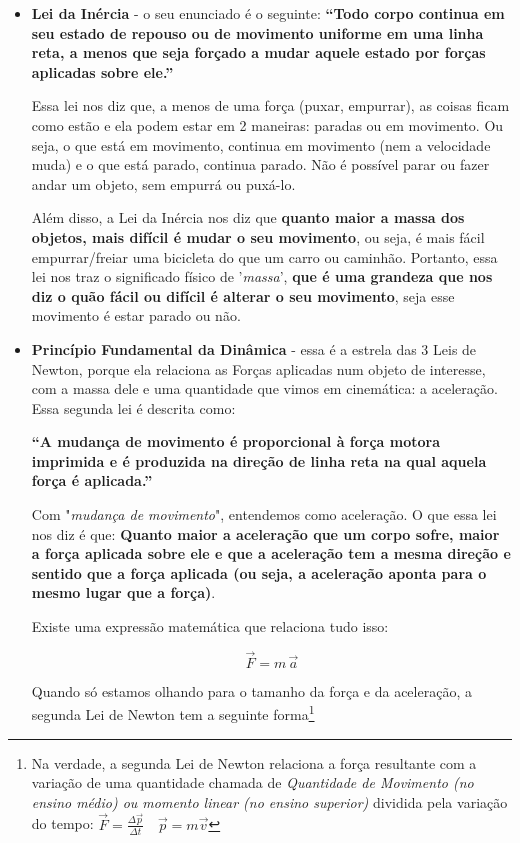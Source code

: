 \documentclass[12pt]{extarticle}
\newcommand{\<}{\langle}
\renewcommand{\>}{\rangle}
\theoremstyle{definition}
\begin{document}
\begin{itemize}
    \item \textbf{Lei da Inércia} - o seu enunciado é o seguinte: \textbf{“Todo corpo continua em seu estado de repouso ou de movimento uniforme em uma linha reta, a menos que seja forçado a mudar aquele estado por forças aplicadas sobre ele.”} 
    
    Essa lei nos diz que, a menos de uma força (puxar, empurrar), as coisas ficam como estão e ela podem estar em 2 maneiras: paradas ou em movimento. Ou seja, o que está em movimento, continua em movimento (nem a velocidade muda) e o que está parado, continua parado. Não é possível parar ou fazer andar um objeto, sem empurrá ou puxá-lo.
    
    Além disso, a Lei da Inércia nos diz que \textbf{quanto maior a massa dos objetos, mais difícil é mudar o seu movimento}, ou seja, é mais fácil empurrar/freiar uma bicicleta do que um carro ou caminhão. Portanto, essa lei nos traz o significado físico de '\textit{massa}', \textbf{que é uma grandeza que nos diz o quão fácil ou difícil é alterar o seu movimento}, seja esse movimento é estar parado ou não.
    
    \item \textbf{Princípio Fundamental da Dinâmica} - essa é a estrela das 3 Leis de Newton, porque ela relaciona as Forças aplicadas num objeto de interesse, com a massa dele e uma quantidade que vimos em cinemática: a aceleração. Essa segunda lei é descrita como:
    
    \textbf{“A mudança de movimento é proporcional à força motora imprimida e é produzida na direção de linha reta na qual aquela força é aplicada.”}
    
    Com "\textit{mudança de movimento}", entendemos como aceleração. O que essa lei nos diz é que: \textbf{Quanto maior a aceleração que um corpo sofre, maior a força aplicada sobre ele e que a aceleração tem a mesma direção e sentido que a força aplicada (ou seja, a aceleração aponta para o mesmo lugar que a força)}.
    
    Existe uma expressão matemática que relaciona tudo isso:
    
    \begin{equation}\label{eq:newton_vec}
        \Vec{F} = m\,\Vec{a}
    \end{equation}
    
    Quando só estamos olhando para o tamanho da força e da aceleração, a segunda Lei de Newton tem a seguinte forma\footnote{Na verdade, a segunda Lei de Newton relaciona a força resultante com a variação de uma quantidade chamada de \textit{Quantidade de Movimento (no ensino médio) ou momento linear (no ensino superior)} dividida pela variação do tempo: $\Vec{F} = \frac{\Delta \Vec{p}}{\Delta t} \quad \Vec{p} = m\Vec{v}$
    
}
\end{itemize}
\end{document}
